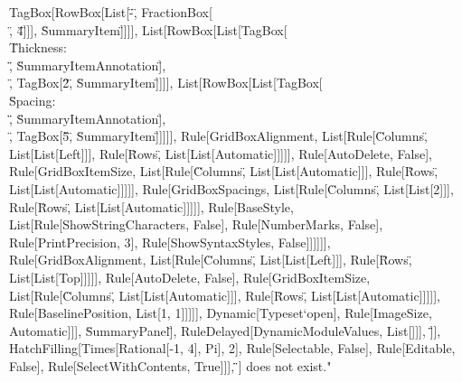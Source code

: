 \documentclass{article}
\begin{document}
{{{{TagBox[RowBox[List[\"-\", FractionBox[\"\\[Pi]\", \"4\"]]], \"SummaryItem\"]]]], List[RowBox[List[TagBox[\"\\\"Thickness: \\\"\", \"SummaryItemAnnotation\"],
\"\\[InvisibleSpace]\", TagBox[\"2\", \"SummaryItem\"]]]], List[RowBox[List[TagBox[\"\\\"Spacing: \\\"\", \"SummaryItemAnnotation\"], \"\\[InvisibleSpace]\",
TagBox[\"5\", \"SummaryItem\"]]]]], Rule[GridBoxAlignment, List[Rule[\"Columns\", List[List[Left]]], Rule[\"Rows\", List[List[Automatic]]]]], Rule[AutoDelete,
False], Rule[GridBoxItemSize, List[Rule[\"Columns\", List[List[Automatic]]], Rule[\"Rows\", List[List[Automatic]]]]], Rule[GridBoxSpacings, List[Rule[\"Columns\",
List[List[2]]], Rule[\"Rows\", List[List[Automatic]]]]], Rule[BaseStyle, List[Rule[ShowStringCharacters, False], Rule[NumberMarks, False], Rule[PrintPrecision,
3], Rule[ShowSyntaxStyles, False]]]]]], Rule[GridBoxAlignment, List[Rule[\"Columns\", List[List[Left]]], Rule[\"Rows\", List[List[Top]]]]], Rule[AutoDelete,
False], Rule[GridBoxItemSize, List[Rule[\"Columns\", List[List[Automatic]]], Rule[\"Rows\", List[List[Automatic]]]]], Rule[BaselinePosition, List[1,
1]]]]], Dynamic[Typeset`open$$], Rule[ImageSize, Automatic]]], \"SummaryPanel\"], RuleDelayed[DynamicModuleValues, List[]]], \"]\"}], HatchFilling[Times[Rational[-1,
4], Pi], 2], Rule[Selectable, False], Rule[Editable, False], Rule[SelectWithContents, True]]}], \"}\"}]\) does not exist."\)
\end{document}
